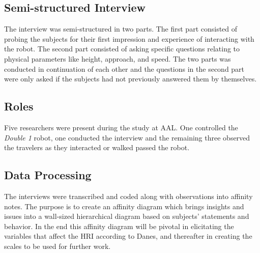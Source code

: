 \subsection{Semi-structured Interview}
The interview was semi-structured in two parts. The first part consisted of probing the subjects for their first impression and experience of interacting with the robot. The second part consisted of asking specific questions relating to physical parameters like height, approach, and speed. The two parts was conducted in continuation of each other and the questions in the second part were only asked if the subjects had not previously answered them by themselves.
 
\subsection{Roles}
Five researchers were present during the study at AAL. One controlled the \textit{Double 1} robot, one conducted the interview and the remaining three observed the travelers as they interacted or walked passed the robot. 

\subsection{Data Processing}
The interviews were transcribed and coded along with observations into affinity notes. The purpose is to create an affinity diagram \cite{Wendell2005} which brings insights and issues into a wall-sized hierarchical diagram based on subjects' statements and behavior. In the end this affinity diagram will be pivotal in elicitating the variables that affect the HRI according to Danes, and thereafter in creating the scales to be used for further work.




